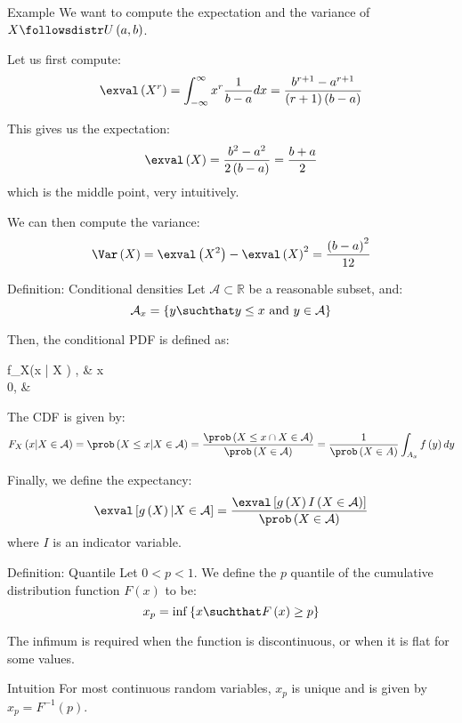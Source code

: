 \documentclass[a4paper]{article}
\begin{document}
\begin{parag}{Example}
    We want to compute the expectation and the variance of $X \followsdistr U\left(a, b\right)$. 

    Let us first compute: 
    \[\exval\left(X^r\right) = \int_{-\infty}^{\infty} x^r \frac{1}{b-a}dx = \frac{b^{r+1} - a^{r+1}}{\left(r+1\right)\left(b-a\right)}\]

    This gives us the expectation: 
    \[\exval\left(X\right) = \frac{b^2 - a ^2}{2\left(b-a\right)} = \frac{b+a}{2}\]
    which is the middle point, very intuitively.
    
    We can then compute the variance: 
    \[\Var\left(X\right) = \exval\left(X^2\right) - \exval\left(X\right)^2 = \frac{\left(b-a\right)^2}{12}\]
\end{parag}

\begin{parag}{Definition: Conditional densities}
    Let $\mathcal{A} \subset \mathbb{R}$ be a reasonable subset, and:
    \[\mathcal{A}_x = \left\{y \suchthat y \leq x \text{ and } y \in \mathcal{A}\right\}\]

    Then, the conditional PDF is defined as: 
    \begin{functionbypart}{f_X\left(x | X \in {}\right)}
        , & x \in {} \\
        0, & 
    \end{functionbypart}
    
    The CDF is given by: 
    \[F_X\left(x | X \in \mathcal{A}\right) = \prob\left(X \leq x | X \in \mathcal{A}\right) = \frac{\prob\left(X \leq x \cap X \in\mathcal{A}\right)}{\prob\left(X \in \mathcal{A}\right)} = \frac{1}{\prob\left(X \in A\right)}\int_{A_x} f\left(y\right)dy\]
    
    Finally, we define the expectancy:
    \[\exval\left[g\left(X\right) | X \in \mathcal{A}\right] = \frac{\exval\left[g\left(X\right)I\left(X \in \mathcal{A}\right)\right]}{\prob\left(X \in \mathcal{A}\right)}\]
    where $I$ is an indicator variable.
\end{parag}

\begin{parag}{Definition: Quantile}
    Let $0 < p < 1$. We define the $p$ quantile of the cumulative distribution function $F\left(x\right)$ to be: 
    \[x_p = \inf\left\{x \suchthat F\left(x\right) \geq p\right\}\]

    The infimum is required when the function is discontinuous, or when it is flat for some values.
    
    \begin{subparag}{Intuition}
        For most continuous random variables, $x_p$ is unique and is given by $x_p = F^{-1}\left(p\right)$.
    \end{subparag}
\end{parag}
\end{document}
